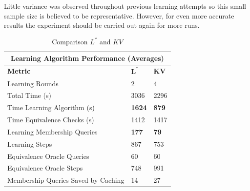 Little variance was observed throughout previous learning attempts so this small sample size is believed to be representative. However, for even more accurate results the experiment should be carried out again for more runs. 


\begin{table}[t]
	\centering
	\begin{tabular}{ |p{6.5cm}||p{1cm}|p{1cm}|  }
		\hline
		\multicolumn{3}{|c|}{\textbf{Learning Algorithm Performance (Averages)}} \\
		\hline
		\textbf{Metric} & $\mathbf{L^*}$ & $\mathbf{KV}$ \\
		\hline
		Learning Rounds							&	2				&	4 				\\
		Total Time (s)							&   3036			& 	2296   			\\
		Time Learning Algorithm	(s)				&	\textbf{1624}	& 	\textbf{879}	\\
		Time Equivalence Checks (s)				& 	1412			& 	1417			\\
		Learning Membership Queries 			&   \textbf{177}	& 	\textbf{79}		\\
		Learning Steps							& 	867	  			& 	753   			\\
		Equivalence Oracle Queries				& 	60  			&  	60				\\
		Equivalence Oracle Steps				& 	748  			&  	991				\\
		Membership Queries Saved by Caching		& 	14  			&  	27				\\
		\hline
	\end{tabular}
	\caption{Comparison $L^*$ and $KV$}
	\label{tab:compkvlstar}
\end{table}

